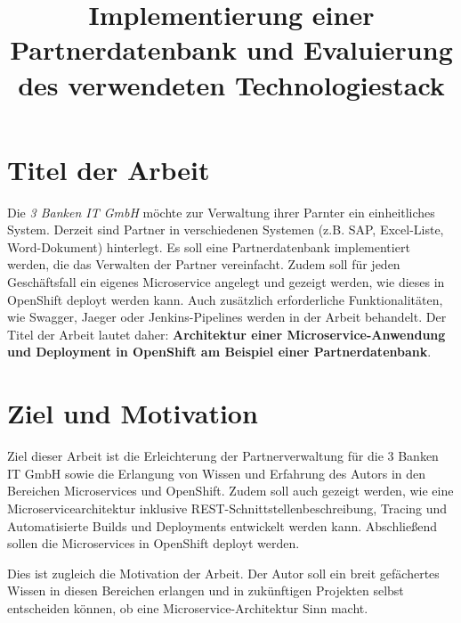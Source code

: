 \documentclass[master,german]{hgbthesis}
\title{Implementierung einer Partnerdatenbank und Evaluierung des verwendeten Technologiestack} %
\begin{document}

\frontmatter							%



%

\mainmatter          			%

\section{Titel der Arbeit}
Die \textit{3 Banken IT GmbH} möchte zur Verwaltung ihrer Parnter ein einheitliches System. Derzeit sind Partner in verschiedenen Systemen (z.B. SAP, Excel-Liste, Word-Dokument) hinterlegt. Es soll eine Partnerdatenbank implementiert werden, die das Verwalten der Partner vereinfacht.
Zudem soll für jeden Geschäftsfall ein eigenes Microservice angelegt und gezeigt werden, wie dieses in OpenShift deployt werden kann. Auch zusätzlich erforderliche Funktionalitäten, wie Swagger, Jaeger oder Jenkins-Pipelines werden in der Arbeit behandelt.
Der Titel der Arbeit lautet daher: \glqq \textbf{Architektur einer Microservice-Anwendung und Deployment in OpenShift am Beispiel einer Partnerdatenbank}\grqq.

{\section{Ziel und Motivation}}
Ziel dieser Arbeit ist die Erleichterung der Partnerverwaltung für die 3 Banken IT GmbH sowie die Erlangung von Wissen und Erfahrung des Autors in den Bereichen Microservices und OpenShift. Zudem soll auch gezeigt werden, wie eine Microservicearchitektur inklusive REST-Schnittstellenbeschreibung, Tracing und Automatisierte Builds und Deployments entwickelt werden kann. Abschließend sollen die Microservices in OpenShift deployt werden.

Dies ist zugleich die Motivation der Arbeit. Der Autor soll ein breit gefächertes Wissen in diesen Bereichen erlangen und in zukünftigen Projekten selbst entscheiden können, ob eine Microservice-Architektur Sinn macht.
\end{document}
